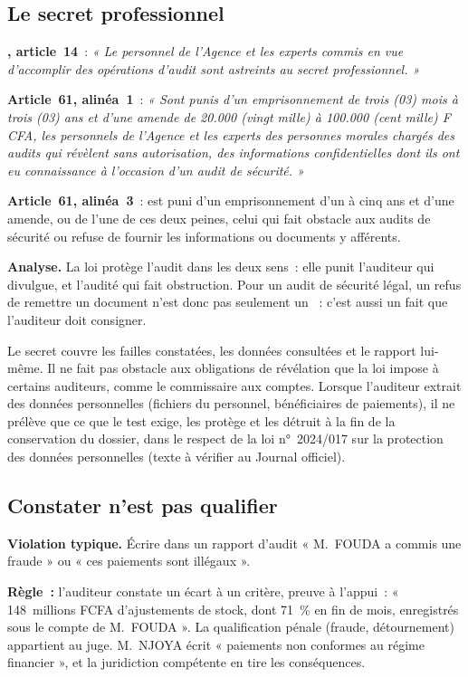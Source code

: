\subsection{Le secret professionnel}

\begin{boxjuris}
\textbf{, article~14}~: \textit{« Le personnel de
l'Agence et les experts commis en vue d'accomplir des opérations d'audit
sont astreints au secret professionnel. »}

\medskip
\textbf{Article~61, alinéa~1}~: \textit{« Sont punis d'un emprisonnement de
trois (03) mois à trois (03) ans et d'une amende de 20.000 (vingt mille) à
100.000 (cent mille) F CFA, les personnels de l'Agence et les experts des
personnes morales chargés des audits qui révèlent sans autorisation, des
informations confidentielles dont ils ont eu connaissance à l'occasion
d'un audit de sécurité. »}

\medskip
\textbf{Article~61, alinéa~3}~: est puni d'un emprisonnement d'un à cinq
ans et d'une amende, ou de l'une de ces deux peines, celui qui fait
obstacle aux audits de sécurité ou refuse de fournir les informations ou
documents y afférents.

\medskip
\textbf{Analyse.} La loi protège l'audit dans les deux sens~: elle punit
l'auditeur qui divulgue, et l'audité qui fait obstruction. Pour un audit
de sécurité légal, un refus de remettre un document n'est donc pas
seulement un \NEK{}~: c'est aussi un fait que l'auditeur doit consigner.
\end{boxjuris}

Le secret couvre les failles constatées, les données consultées et le
rapport lui-même. Il ne fait pas obstacle aux obligations de révélation
que la loi impose à certains auditeurs, comme le commissaire aux comptes.
Lorsque l'auditeur extrait des données personnelles (fichiers du
personnel, bénéficiaires de paiements), il ne prélève que ce que le test
exige, les protège et les détruit à la fin de la conservation du dossier,
dans le respect de la loi n°~2024/017 sur la protection des données
personnelles (texte à vérifier au Journal officiel).

\subsection{Constater n'est pas qualifier}

\begin{boxalert}
\textbf{Violation typique.} Écrire dans un rapport d'audit « M.~FOUDA a
commis une fraude » ou « ces paiements sont illégaux ».

\smallskip
\textbf{Règle~:} l'auditeur constate un écart à un critère, preuve à
l'appui~: « 148~millions FCFA d'ajustements de stock, dont 71~\% en fin
de mois, enregistrés sous le compte de M.~FOUDA ». La qualification pénale
(fraude, détournement) appartient au juge. M.~NJOYA écrit « paiements non
conformes au régime financier », et la juridiction compétente en tire les
conséquences.
\end{boxalert}

